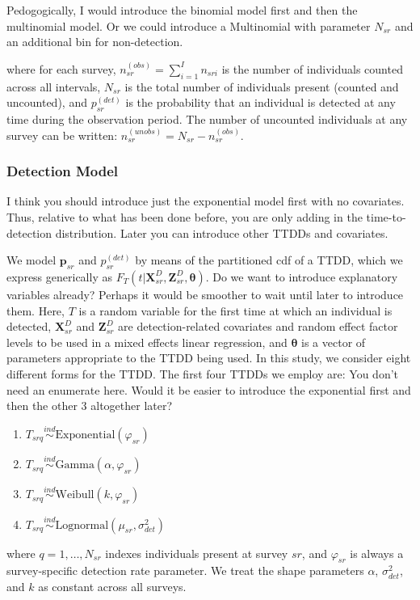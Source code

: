 \documentclass[useAMS,usenatbib,referee,12pt]{article}
\newcommand{\jarad}[1]{{\color{red} #1}}
\begin{document}
\jarad{Pedogogically, I would introduce the binomial model first and then the multinomial model. Or we could introduce a Multinomial with parameter $N_{sr}$ and an additional bin for non-detection.}

where for each survey, $n_{sr}^{(obs)} = \sum_{i=1}^I n_{sri}$ is the number of individuals counted across all intervals, $N_{sr}$ is the total number of individuals present (counted and uncounted), and $p_{sr}^{(det)}$ is the probability that an individual is detected at any time during the observation period.  The number of uncounted individuals at any survey can be written: $n_{sr}^{(unobs)} = N_{sr} - n_{sr}^{(obs)}$.



\subsubsection{Detection Model}\label{sec:detectionmodel}

\jarad{I think you should introduce just the exponential model first with no covariates. Thus, relative to what has been done before, you are only adding in the time-to-detection distribution. Later you can introduce other TTDDs and covariates.}

We model $\textbf{p}_{sr}$ and $p_{sr}^{(det)}$ by means of the partitioned cdf of a TTDD, which we express generically as $F_T(t|\textbf{X}_{sr}^D, \textbf{Z}_{sr}^D, \boldsymbol{\theta})$. 
\jarad{Do we want to introduce explanatory variables already? Perhaps it would be smoother to wait until later to introduce them.}
Here, $T$ is a random variable for the first time at which an individual is detected, $\textbf{X}_{sr}^D$ and $\textbf{Z}_{sr}^D$ are detection-related covariates and random effect factor levels to be used in a mixed effects linear regression, and $\boldsymbol{\theta}$ is a vector of parameters appropriate to the TTDD being used.  In this study, we consider eight different forms for the TTDD.  The first four TTDDs we employ are:
\jarad{You don't need an enumerate here. Would it be easier to introduce the exponential first and then the other 3 altogether later?}
\begin{enumerate}
\item $T_{srq} \overset{ind}{\sim} \text{Exponential}(\varphi_{sr})$
\item $T_{srq} \overset{ind}{\sim} \text{Gamma}(\alpha, \varphi_{sr})$
\item $T_{srq} \overset{ind}{\sim} \text{Weibull}(k, \varphi_{sr})$
\item $T_{srq} \overset{ind}{\sim} \text{Lognormal}(\mu_{sr}, \sigma_{det}^2)$
\end{enumerate}
where $q = 1,\dotso,N_{sr}$ indexes individuals present at survey $sr$, and $\varphi_{sr}$ is always a survey-specific detection rate parameter.  We treat the shape parameters $\alpha$, $\sigma_{det}^2$, and $k$ as constant across all surveys.
\end{document}
